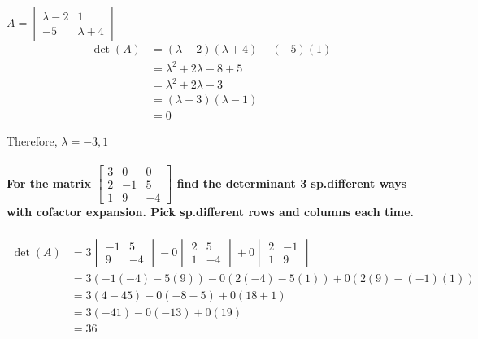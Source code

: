 \documentclass[
  letterpaper,
  DIV=11,
  numbers=noendperiod]{scrartcl}
\let\oldparagraph\paragraph
\renewcommand{\paragraph}[1]{\oldparagraph{#1}\mbox{}}
\begin{document}
\(A = \begin{bmatrix}\lambda-2 & 1 \\ -5 & \lambda+4\end{bmatrix}\)
\begin{align*}
\det(A) &= (\lambda-2)(\lambda+4)-(-5)(1) \\
&= \lambda^2+2\lambda-8+5 \\
&= \lambda^2+2\lambda-3 \\
&= (\lambda+3)(\lambda-1) \\
&= 0
\end{align*}

Therefore, \(\lambda = -3, 1\)

\newpage{}

\hypertarget{for-the-matrix-beginbmatrix3-0-0-2--1-5-1-9--4endbmatrix-find-the-determinant-3-sp.different-ways-with-cofactor-expansion.-pick-sp.different-rows-and-columns-each-time.}{%
\paragraph{\texorpdfstring{For the matrix
\(\begin{bmatrix}3 & 0 & 0 \\2 & -1 & 5 \\ 1 & 9 & -4\end{bmatrix}\)
find the determinant 3 sp.different ways with cofactor expansion. Pick
sp.different rows and columns each
time.}{For the matrix \textbackslash begin\{bmatrix\}3 \& 0 \& 0 \textbackslash\textbackslash2 \& -1 \& 5 \textbackslash\textbackslash{} 1 \& 9 \& -4\textbackslash end\{bmatrix\} find the determinant 3 sp.different ways with cofactor expansion. Pick sp.different rows and columns each time.}}\label{for-the-matrix-beginbmatrix3-0-0-2--1-5-1-9--4endbmatrix-find-the-determinant-3-sp.different-ways-with-cofactor-expansion.-pick-sp.different-rows-and-columns-each-time.}}

\begin{align*}
\det(A) &= 3\begin{vmatrix}-1 & 5 \\ 9 & -4\end{vmatrix}-0\begin{vmatrix}2 & 5 \\ 1 & -4\end{vmatrix}+0\begin{vmatrix}2 & -1 \\ 1 & 9\end{vmatrix} \\
&= 3(-1(-4)-5(9))-0(2(-4)-5(1))+0(2(9)-(-1)(1)) \\
&= 3(4-45)-0(-8-5)+0(18+1) \\
&= 3(-41)-0(-13)+0(19) \\
&= 36
\end{align*}
\end{document}
